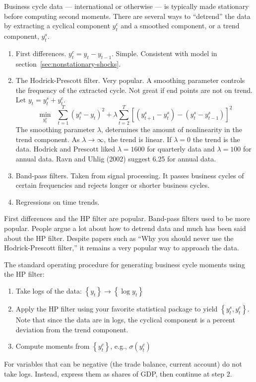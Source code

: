 \documentclass[11pt,pdftex,twoside,letterpaper]{exam}
\begin{document}
 Business cycle data --- international or otherwise --- is typically made stationary before computing second moments. There are several ways to ``detrend'' the data by extracting a cyclical component $y^c_t$ and a smoothed component, or a trend component, $y^s_t$.
 \begin{enumerate}
   \item First differences. $y_t^c = y_t-y_{t-1}$. Simple. Consistent with model in section~\ref{sec:nonstationary-shocks}.
   \item The Hodrick-Prescott filter. Very popular. A smoothing parameter controls the frequency of the extracted cycle. Not great if end points are not on trend. Let $y_t = y^s_t+y^c_t$.
       \begin{equation}
         \min_{y_t^s} \;\; \sum_{t=1}^T \left(y^s_t-y_t \right)^2 + \lambda\sum_{t=2}^T \left[ \left( y_{t+1}^s-y_t^s \right) - \left( y_{t}^s-y_{t-1}^s \right) \right]^2
       \end{equation}
       The smoothing parameter $\lambda$, determines the amount of nonlinearity in the trend component. As $ \lambda \to \infty$, the trend is linear. If $\lambda=0$ the trend is the data. Hodrick and Prescott liked $\lambda=1600$ for quarterly data and $\lambda=100$ for annual data. Ravn and Uhlig (2002) suggest 6.25 for annual data.
   \item Band-pass filters. Taken from signal processing. It passes business cycles of certain frequencies and rejects longer or shorter business cycles.
   \item Regressions on time trends.
 \end{enumerate}

 First differences and the HP filter are popular. Band-pass filters used to be more popular. People argue a lot about how to detrend data and much has been said about the HP filter. Despite papers such as ``Why you should never use the Hodrick-Prescott filter,'' it remains a very popular way to approach the data.

The standard operating procedure for generating business cycle moments using the HP filter:
\begin{enumerate}
  \item Take logs of the data: $\left\{y_t\right\}\rightarrow \left\{\log y_t\right\}$
  \item Apply the HP filter using your favorite statistical package to yield $\left\{y^s_t, y^c_t\right\}$. Note that since the data are in logs, the cyclical component is a percent deviation from the trend component.
  \item Compute moments from $\left\{y^c_t\right\}$, e.g., $\sigma\left(y^c_t\right)$
\end{enumerate}
For variables that can be negative (the trade balance, current account) do not take logs. Instead, express them as shares of GDP, then continue at step 2.
\end{document}
